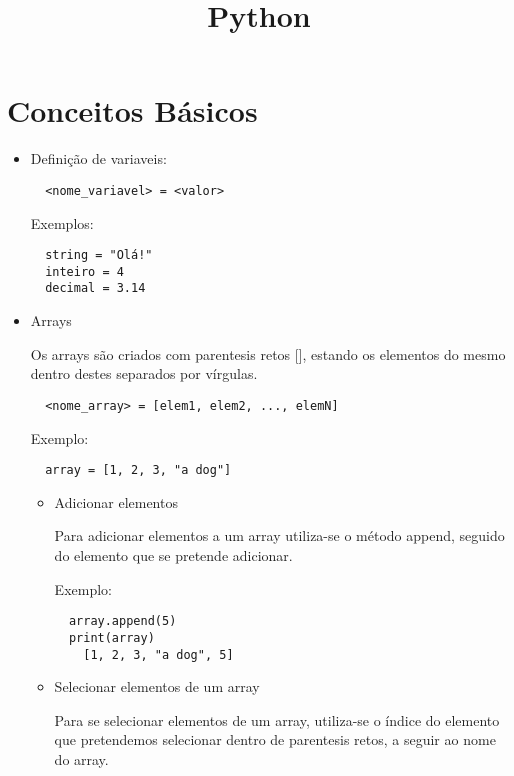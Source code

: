 \documentclass{article}
\title{Python}
\begin{document}
  \maketitle
  \section{Conceitos Básicos}
  
  \begin{itemize}
  \item Defini\c c\~ao de variaveis:
  
  \begin{lstlisting}
  <nome_variavel> = <valor>
  \end{lstlisting}
  
  Exemplos:
  
  \begin{lstlisting}
  string = "Olá!"
  inteiro = 4
  decimal = 3.14
  \end{lstlisting}
  
  \item Arrays
  
  Os arrays s\~ao criados com parentesis retos [], estando os elementos do mesmo dentro destes separados por v\'irgulas.
  
  \begin{lstlisting}
  <nome_array> = [elem1, elem2, ..., elemN]
  \end{lstlisting}
  
  Exemplo:
  
  \begin{lstlisting}
  array = [1, 2, 3, "a dog"]
  \end{lstlisting}
  
  \begin{itemize}
  \item Adicionar elementos
  
  Para adicionar elementos a um array utiliza-se o m\'etodo append, seguido do elemento que se pretende adicionar.
  
  Exemplo:
  
  \begin{lstlisting}
  array.append(5)
  print(array)
    [1, 2, 3, "a dog", 5]
  \end{lstlisting}
  
  \item Selecionar elementos de um array
  
  Para se selecionar elementos de um array, utiliza-se o \'indice do elemento que pretendemos selecionar dentro de parentesis retos, a seguir ao nome do array.
  

\end{itemize}
\end{itemize}
\end{document}
